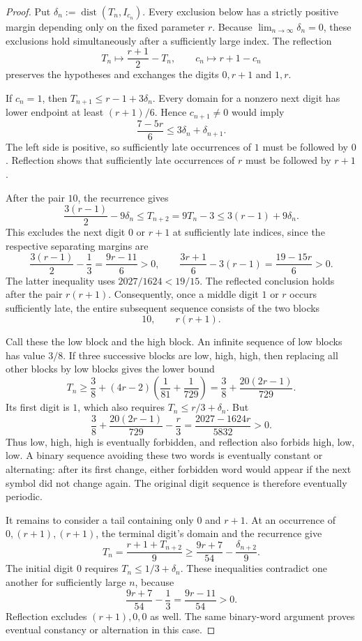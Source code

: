 \documentclass[11pt,a4paper]{amsart}
\numberwithin{equation}{section}
\theoremstyle{definition}
\begin{document}
\begin{proof}
Put \(\delta_n:=\operatorname{dist}(T_n,I_{c_n})\).
Every exclusion below has a strictly positive margin depending only
on the fixed parameter \(r\). Because
\(\displaystyle\lim_{n\to\infty}\delta_n=0\), these exclusions hold
simultaneously after a sufficiently large index.
The reflection
\[
T_n\longmapsto\frac{r+1}{2}-T_n,\qquad
c_n\longmapsto r+1-c_n
\]
preserves the hypotheses and exchanges the digits \(0,r+1\) and \(1,r\).

If \(c_n=1\), then \(T_{n+1}\leq r-1+3\delta_n\).
Every domain for a nonzero next digit has lower endpoint at least
\((r+1)/6\). Hence \(c_{n+1}\ne0\) would imply
\[
\frac{7-5r}{6}\leq3\delta_n+\delta_{n+1}.
\]
The left side is positive, so sufficiently late occurrences of \(1\)
must be followed by \(0\). Reflection shows that sufficiently late
occurrences of \(r\) must be followed by \(r+1\).

After the pair \(10\), the recurrence gives
\[
\frac{3(r-1)}2-9\delta_n
\leq T_{n+2}=9T_n-3
\leq3(r-1)+9\delta_n.
\]
This excludes the next digit \(0\) or \(r+1\) at sufficiently late
indices, since the respective separating margins are
\[
\frac{3(r-1)}2-\frac13=\frac{9r-11}{6}>0,
\qquad
\frac{3r+1}{6}-3(r-1)=\frac{19-15r}{6}>0.
\]
The latter inequality uses \(2027/1624<19/15\).
The reflected conclusion holds after the pair \(r(r+1)\).
Consequently, once a middle digit \(1\) or \(r\) occurs sufficiently
late, the entire subsequent sequence consists of the two blocks
\[
10,\qquad r(r+1).
\]

Call these the low block and the high block.
An infinite sequence of low blocks has value \(3/8\).
If three successive blocks are low, high, high, then replacing all
other blocks by low blocks gives the lower bound
\[
T_n\geq\frac38+(4r-2)\left(\frac1{81}+\frac1{729}\right)
       =\frac38+\frac{20(2r-1)}{729}.
\]
Its first digit is \(1\), which also requires \(T_n\leq r/3+\delta_n\).
But
\[
\frac38+\frac{20(2r-1)}{729}-\frac r3
=\frac{2027-1624r}{5832}>0.
\]
Thus low, high, high is eventually forbidden, and reflection also
forbids high, low, low.
A binary sequence avoiding these two words is eventually constant
or alternating: after its first change, either forbidden word would
appear if the next symbol did not change again.
The original digit sequence is therefore eventually periodic.

It remains to consider a tail containing only \(0\) and \(r+1\).
At an occurrence of \(0,(r+1),(r+1)\), the terminal digit's domain
and the recurrence give
\[
T_n=\frac{r+1+T_{n+2}}9
\geq\frac{9r+7}{54}-\frac{\delta_{n+2}}9.
\]
The initial digit \(0\) requires \(T_n\leq1/3+\delta_n\).
These inequalities contradict one another for sufficiently large \(n\),
because
\[
\frac{9r+7}{54}-\frac13=\frac{9r-11}{54}>0.
\]
Reflection excludes \((r+1),0,0\) as well.
The same binary-word argument proves eventual constancy or alternation
in this case.
\end{proof}
\end{document}
